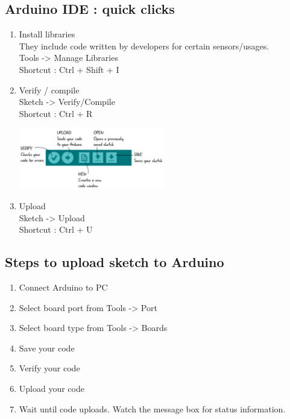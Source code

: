 \subsection{Arduino IDE : quick clicks}
\begin{enumerate}
    \item Install libraries\\
    They include code written by developers for certain sensors/usages.\\
    Tools -> Manage Libraries\\
    Shortcut : Ctrl + Shift + I
    
    \item Verify / compile\\
    Sketch -> Verify/Compile\\
    Shortcut : Ctrl + R
    
    \begin{marginfigure}
        \hspace{-4cm}\includegraphics[width=2.5in]{Images/Programing_Arduino/quick_tool.png}
    \end{marginfigure}
    
    \item Upload\\
    Sketch -> Upload\\
    Shortcut : Ctrl + U
\end{enumerate}

\subsection{Steps to upload sketch to Arduino}
\begin{enumerate}
    \item Connect Arduino to PC
    \item Select board port from Tools -> Port
    \item Select board type from Tools -> Boards
    \item Save your code 
    \item Verify your code
    \item Upload your code
    \item Wait until code uploads. Watch the message box for status information.
\end{enumerate}

